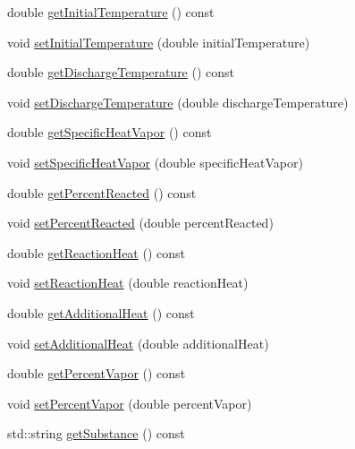 \begin{DoxyCompactItemize}
\item 
double \hyperlink{class_gas_load_charge_material_af8a83c3720d108baa196394105822db7}{get\+Initial\+Temperature} () const
\item 
void \hyperlink{class_gas_load_charge_material_aec9ddfce5e31099b6a047e3d98d80d47}{set\+Initial\+Temperature} (double initial\+Temperature)
\item 
double \hyperlink{class_gas_load_charge_material_a6baaf6ad65e2a3d1fa90b7c007bc3c53}{get\+Discharge\+Temperature} () const
\item 
void \hyperlink{class_gas_load_charge_material_a6c53344d5370a1e9b7321a530a6843c0}{set\+Discharge\+Temperature} (double discharge\+Temperature)
\item 
double \hyperlink{class_gas_load_charge_material_a9a07e86938bb831e51ac3f53f696a3c3}{get\+Specific\+Heat\+Vapor} () const
\item 
void \hyperlink{class_gas_load_charge_material_a7498eba84bb8bdfc5344f0e44418260b}{set\+Specific\+Heat\+Vapor} (double specific\+Heat\+Vapor)
\item 
double \hyperlink{class_gas_load_charge_material_af47b4c6c3e547325cadd81cbb09937ee}{get\+Percent\+Reacted} () const
\item 
void \hyperlink{class_gas_load_charge_material_a7142cb6bbfba53d640dd6f1590fe32f6}{set\+Percent\+Reacted} (double percent\+Reacted)
\item 
double \hyperlink{class_gas_load_charge_material_a605eaf21d1f25f27b53627aeb903c93d}{get\+Reaction\+Heat} () const
\item 
void \hyperlink{class_gas_load_charge_material_a721f02cbd0bfbb6ebe67c0da09f0b0f2}{set\+Reaction\+Heat} (double reaction\+Heat)
\item 
double \hyperlink{class_gas_load_charge_material_a5c01f171b61c01c93db6453cb122e1ba}{get\+Additional\+Heat} () const
\item 
void \hyperlink{class_gas_load_charge_material_a08ef5196ea9919dfc71be6744c7da08e}{set\+Additional\+Heat} (double additional\+Heat)
\item 
double \hyperlink{class_gas_load_charge_material_a19b8ecfad235b5824b0a88903cff667a}{get\+Percent\+Vapor} () const
\item 
void \hyperlink{class_gas_load_charge_material_acace81e16ef531acb0a68462ab0ed25d}{set\+Percent\+Vapor} (double percent\+Vapor)
\item 
std\+::string \hyperlink{class_gas_load_charge_material_a5f967841f196f6b0b35f32f9610092e3}{get\+Substance} () const
\item 

\end{DoxyCompactItemize}
